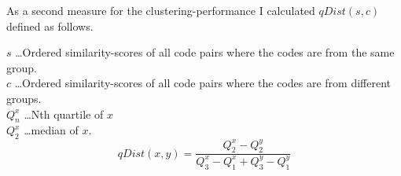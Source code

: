 \documentclass[../main.tex]{subfiles}
\begin{document}
As a second measure for the clustering-performance I calculated $qDist(s,c)$ defined as follows.

$s$ \dots Ordered similarity-scores of all code pairs where the codes are from the same group.\\
$c$ \dots Ordered similarity-scores of all code pairs where the codes are from different groups.\\
$Q_n^x$ \dots Nth quartile of $x$\\
$Q_2^x$ \dots median of $x$.
\begin{equation}
  qDist(x,y) = \dfrac{Q_2^x - Q_2^y}{Q_3^x - Q_1^x + Q_3^y - Q_1^y}
  \label{eq:qDist}
\end{equation}
\end{document}
